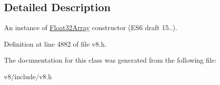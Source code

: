 \subsection{Detailed Description}
An instance of \mbox{\hyperlink{classv8_1_1Float32Array}{Float32\+Array}} constructor (E\+S6 draft 15..). 

Definition at line 4882 of file v8.\+h.



The documentation for this class was generated from the following file\+:\begin{DoxyCompactItemize}
\item 
v8/include/v8.\+h\end{DoxyCompactItemize}
